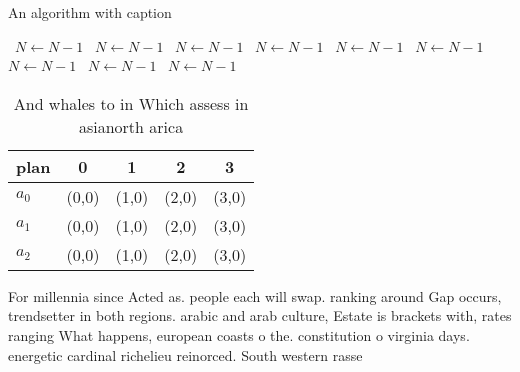 \documentclass[a4paper]{article}
\begin{document}
\begin{algorithm}
\caption{An algorithm with caption}
\begin{algorithmic}
\    \State $N \gets N - 1$
\    \State $N \gets N - 1$
\    \State $N \gets N - 1$
\    \State $N \gets N - 1$
\    \State $N \gets N - 1$
\    \State $N \gets N - 1$
\    \State $N \gets N - 1$
\    \State $N \gets N - 1$
\    \State $N \gets N - 1$
\EndWhile
\end{algorithmic}
\end{algorithm}

\begin{table}
\begin{adjustbox}{width=0.5\columnwidth}
\begin{tabular}{|l|l|l|l|l|}
\hline
\textbf{plan} & \multicolumn{1}{c|}{\textbf{0}} & \multicolumn{1}{c|}{\textbf{1}} & \multicolumn{1}{c|}{\textbf{2}} & \multicolumn{1}{c|}{\textbf{3}} \\ \hline
\textbf{$a_0$}  & (0,0) & (1,0) & (2,0) & (3,0) \\ \hline
\textbf{$a_1$}  & (0,0) & (1,0) & (2,0) & (3,0) \\ \hline
\textbf{$a_2$}  & (0,0) & (1,0) & (2,0) & (3,0) \\ \hline
\end{tabular}
\end{adjustbox}
\caption{And whales to in Which assess in asianorth arica 
}
\end{table}

For millennia since Acted as. people each will swap. ranking around Gap occurs, trendsetter in both regions. arabic and arab culture, Estate is brackets with, rates ranging What happens, european coasts o the. constitution o virginia days. energetic cardinal richelieu reinorced. South western rasse
\end{document}
